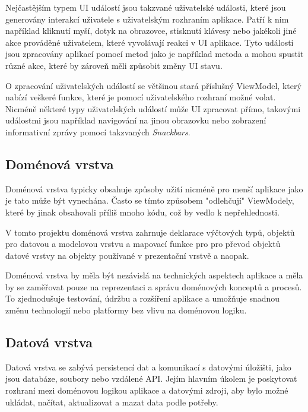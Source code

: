 Nejčastějším typem UI událostí jsou takzvané uživatelské události, které jsou generovány interakcí uživatele s uživatelským rozhraním aplikace. 
Patří k nim například kliknutí myší, dotyk na obrazovce, stisknutí klávesy nebo jakékoli jiné akce prováděné uživatelem, které vyvolávají reakci v 
UI aplikace. Tyto události jsou zpracovány aplikací pomocí metod jako je například metoda  a mohou spustit různé akce, které by zároveň
měli způsobit změny UI stavu.

O zpracování uživatelských událostí se většinou stará příslušný ViewModel, který nabízí veškeré funkce, které je pomocí uživatelského rozhraní možné volat.
Nicméně některé typy uživatelských událostí může UI zpracovat přímo, takovými událostmi jsou například navigování na jinou obrazovku nebo zobrazení 
informativní zprávy pomocí takzvaných \textit{Snackbars}.

\subsection*{Doménová vrstva}
Doménová vrstva typicky obsahuje způsoby užití nicméně pro menší aplikace jako je tato může být vynechána. Často se tímto způsobem "odlehčují" ViewModely,
které by jinak obsahovali příliš mnoho kódu, což by vedlo k nepřehlednosti.

V tomto projektu doménová vrstva zahrnuje deklarace výčtových typů, objektů pro datovou a modelovou vrstvu a mapovací funkce pro pro převod
objektů datové vrstvy na objekty používané v prezentační vrstvě a naopak.

Doménová vrstva by měla být nezávislá na technických aspektech aplikace a měla by se zaměřovat pouze na reprezentaci a správu doménových
 konceptů a procesů. To zjednodušuje testování, údržbu a rozšíření aplikace a umožňuje snadnou změnu technologií nebo platformy bez 
 vlivu na doménovou logiku.

\subsection*{Datová vrstva}


Datová vrstva se zabývá persistencí dat a komunikací s datovými úložišti, jako jsou
databáze, soubory nebo vzdálené API. Jejím hlavním úkolem je poskytovat rozhraní mezi doménovou logikou aplikace a datovými zdroji, 
aby bylo možné ukládat, načítat, aktualizovat a mazat data podle potřeby.

